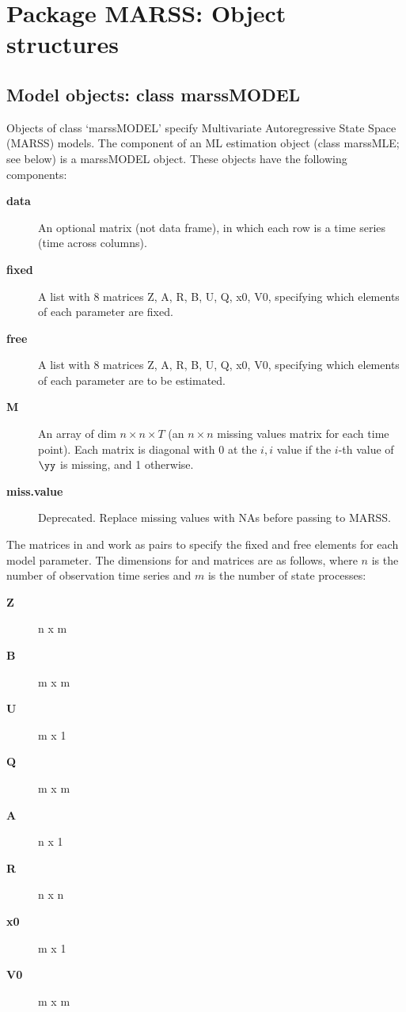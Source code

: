 \chapter{Package MARSS:  Object structures}

\section*{Model objects: class marssMODEL}
Objects of class `marssMODEL' specify Multivariate Autoregressive State Space (MARSS) models. The \verb@model@ component of an ML estimation object (class marssMLE; see below) is a marssMODEL object. These objects have the following components:

  \begin{description}
    \item[\textbf{data}]{ An optional matrix (not data frame), in which each row is a time series (time across columns). }
    \item[\textbf{fixed}]{ A list with 8 matrices Z, A, R, B, U, Q, x0, V0, specifying which elements of each parameter are fixed. }
    \item[\textbf{free}]{ A list with 8 matrices Z, A, R, B, U, Q, x0, V0, specifying which elements of each parameter are to be estimated. }
    \item[\textbf{M}]{ An array of dim $n \times n \times T$ (an $n \times n$ missing values matrix for each time point).  Each matrix is diagonal with 0 at the $i,i$ value if the $i$-th value of $\yy$ is missing, and 1 otherwise.} 
    \item[\textbf{miss.value}]{ Deprecated. Replace missing values with NAs before passing to MARSS. }
  \end{description}

  The matrices in \verb@fixed@ and \verb@free@ work as pairs to specify the fixed and free elements for each model parameter. The dimensions for \verb@fixed@ and \verb@free@ matrices are as follows, where $n$ is the number of observation time series and $m$ is the number of state processes:
  \begin{description}
    \item[\textbf{Z}]{ n x m }
    \item[\textbf{B}]{ m x m }
    \item[\textbf{U}]{ m x 1 }
    \item[\textbf{Q}]{ m x m }
    \item[\textbf{A}]{ n x 1 }
    \item[\textbf{R}]{ n x n }
    \item[\textbf{x0}]{ m x 1 }
    \item[\textbf{V0}]{ m x m }
  \end{description} 

